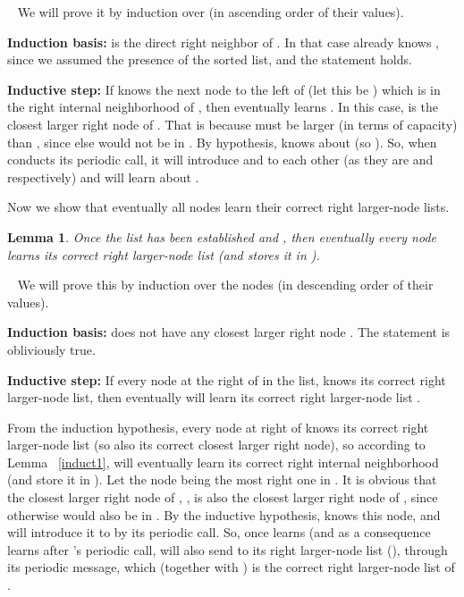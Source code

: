 \documentclass[11pt]{article}
\newtheorem{lemma}[theorem]{Lemma}
\newcommand{\sq}{\hbox{\rlap{}}}
\newcommand{\qed}{\hspace*{\fill}\sq}
\newenvironment{proof}{\noindent {\bf Proof.}\ }{\qed\par\vskip 4mm\par}
\begin{document}
\begin{proof}
We will prove it by induction over  (in ascending order of their  values).

\textbf{Induction basis:}  is the direct right neighbor of .  In that case  already knows , since we assumed the presence of the sorted list, and the statement holds.

\textbf{Inductive step:} If  knows the next node to the left of  (let this be ) which is in the right internal neighborhood of , then  eventually learns .
In this case,  is the closest larger right node of . That is because  must be larger (in terms of capacity) than , since else  would not
be in . By hypothesis,  knows about  (so ). So, when  conducts its periodic  call, it will introduce  and  to each other (as they are  and  respectively)
and  will learn about .
\end{proof}


Now we show that eventually all nodes learn their correct right larger-node lists.


\begin{lemma}\label{S^+}
Once the list has been established and , then eventually every node  learns its correct right larger-node list  (and stores it in ).
\end{lemma}

\begin{proof}
We will prove this by induction over the nodes  (in descending order of their  values).


\textbf{Induction basis:}  does not have any closest larger right node . The statement is obliviously true.


\textbf{Inductive step:} If every node at the right of  in the list, knows its correct right larger-node list, then eventually  will learn its correct right larger-node list .

From the induction hypothesis, every node at right of  knows its correct right larger-node list (so also its correct closest larger right node), so according to Lemma ~\ref{induct1},  will eventually learn its correct right internal neighborhood (and store it in ). Let  the node being the most right one in . It is obvious that the  closest larger right node of , , is also the closest larger right node of , since otherwise  would also be in . By the inductive hypothesis,  knows this node, and will introduce it to  by its periodic  call. So, once  learns  (and as a consequence  learns  after 's periodic  call,  will also send to  its right larger-node list (), through its periodic  message, which (together with ) is the correct right larger-node list of .
\end{proof}
\end{document}

